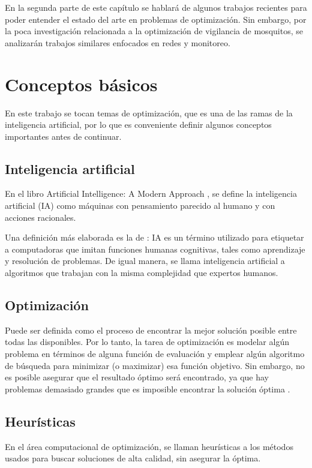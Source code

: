 \documentclass[letterpaper]{report}
\begin{document}
  En la segunda parte de este capítulo se hablará de algunos trabajos recientes
  para poder entender el estado del arte en problemas de optimización. Sin
  embargo, por la poca investigación relacionada a la optimización de vigilancia
  de mosquitos, se analizarán trabajos similares enfocados en redes y
  monitoreo.

\section{Conceptos básicos}
  En este trabajo se tocan temas de optimización, que es una de las ramas de la
  inteligencia artificial, por lo que es conveniente definir algunos conceptos
  importantes antes de continuar. 

  \subsection{Inteligencia artificial}
    En el libro Artificial Intelligence: A Modern Approach
    \cite{AIModernAproach}, se define la inteligencia artificial (IA) como
    máquinas con pensamiento parecido al humano y con acciones racionales.
    
    Una definición más elaborada es la de \cite{AIDef}: IA es un término
    utilizado para etiquetar a computadoras que imitan funciones humanas
    cognitivas, tales como aprendizaje y resolución de problemas. De igual
    manera, se llama inteligencia artificial a algoritmos que trabajan con la
    misma complejidad que expertos humanos.
  
  \subsection{Optimización}
    Puede ser definida como el proceso de encontrar la mejor solución posible
    entre todas las disponibles. Por lo tanto, la tarea de optimización es
    modelar algún problema en términos de alguna función de evaluación y emplear
    algún algoritmo de búsqueda para minimizar (o maximizar) esa función
    objetivo. Sin embargo, no es posible asegurar que el resultado óptimo será
    encontrado, ya que hay problemas demasiado grandes que es imposible
    encontrar la solución óptima \cite{SearchMethodologies}.
  
  \subsection{Heurísticas}
    En el área computacional de optimización, se llaman heurísticas a los
    métodos usados para buscar soluciones de alta calidad, sin asegurar la
    óptima.
\end{document}
